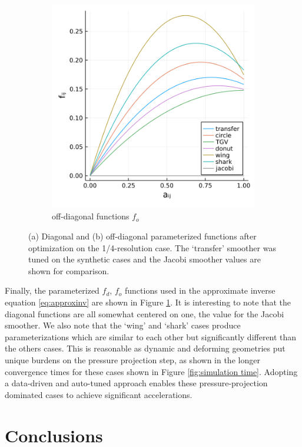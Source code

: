 \documentclass[]{elsarticle}
\begin{document}
\begin{figure}
\begin{subfigure}[b]{0.47\textwidth}
        \includegraphics[width=\textwidth]{figures/lower_fun.png}
        \caption{off-diagonal functions $f_o$}
    \end{subfigure}
        \caption{(a) Diagonal and (b) off-diagonal parameterized functions after optimization on the 1/4-resolution case. The `transfer' smoother was tuned on the synthetic cases and the Jacobi smoother values are shown for comparison.}
        \label{fig:tuned inverse}
\end{figure}

Finally, the parameterized $f_d,\,f_o$ functions used in the approximate inverse equation \ref{eq:approxinv} are shown in Figure \ref{fig:tuned inverse}. It is interesting to note that the diagonal functions are all somewhat centered on one, the value for the Jacobi smoother. We also note that the `wing' and `shark' cases produce parameterizations which are similar to each other but significantly different than the others cases. This is reasonable as dynamic and deforming geometries put unique burdens on the pressure projection step, as shown in the longer convergence times for these cases shown in Figure \ref{fig:simulation time}. Adopting a data-driven and auto-tuned approach enables these pressure-projection dominated cases to achieve significant accelerations.

\section{Conclusions}
\end{document}

